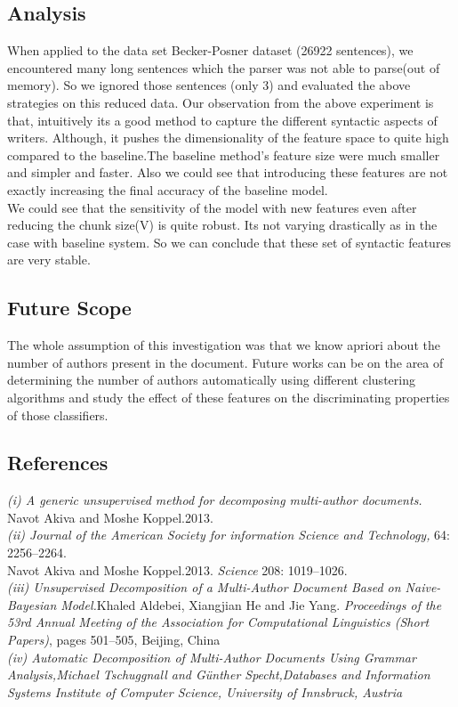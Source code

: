 \documentclass[letterpaper]{article}
\begin{document}
\subsection{Analysis}
When applied to the data set Becker-Posner dataset (26922 sentences), we encountered many long sentences which the parser was not able to parse(out of memory). So we ignored those sentences (only 3) and evaluated the above strategies on this reduced data.
Our observation from the above experiment is that, intuitively its a good method to capture the different syntactic aspects of writers. Although, it pushes the dimensionality of the feature space to quite high compared to the baseline.The baseline method’s feature size were much smaller and simpler and faster. Also we could see that introducing these features are not exactly increasing the final accuracy of the baseline model.\\
We could see that the sensitivity of the model with new features even after reducing the chunk size(V) is quite robust. Its not varying drastically as in the case with baseline system. So we can conclude that these set of syntactic features are very stable.

\subsection{Future Scope}
The whole assumption of this investigation was that we know apriori about the number of authors present in the document. Future works can be on the area of determining the number of authors automatically using different clustering algorithms and study the effect of these features on the discriminating properties of those classifiers.

\subsection{References} 
\textit{(i) A generic unsupervised method for decomposing multi-author documents.} Navot Akiva and Moshe Koppel.2013.\\ \textit{(ii) Journal of the American Society for information Science and Technology,} 64: 2256--2264.\\
Navot Akiva and Moshe Koppel.2013. \textit{Science} 208: 1019--1026.\\
\textit{(iii) Unsupervised Decomposition of a Multi-Author Document Based on Naive-Bayesian Model.}Khaled Aldebei, Xiangjian He and Jie Yang. \textit{Proceedings of the 53rd Annual Meeting of the Association for Computational Linguistics (Short Papers)}, pages 501–505, Beijing, China\\
\textit{(iv) Automatic Decomposition of Multi-Author Documents
Using Grammar Analysis,Michael Tschuggnall and Günther Specht,Databases and Information Systems
Institute of Computer Science, University of Innsbruck, Austria}
\end{document}
